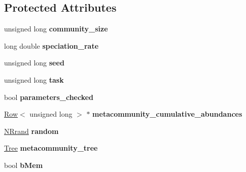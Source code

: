 \subsection*{Protected Attributes}
\begin{DoxyCompactItemize}
\item 
unsigned long {\bfseries community\+\_\+size}\hypertarget{class_metacommunity_a3b392090e764ffb2ada3881e4eddd0b1}{}\label{class_metacommunity_a3b392090e764ffb2ada3881e4eddd0b1}

\item 
long double {\bfseries speciation\+\_\+rate}\hypertarget{class_metacommunity_aad4378b40264345fc6f5116aedc58c26}{}\label{class_metacommunity_aad4378b40264345fc6f5116aedc58c26}

\item 
unsigned long {\bfseries seed}\hypertarget{class_metacommunity_afd81750697ac8540b71de001ee53fc61}{}\label{class_metacommunity_afd81750697ac8540b71de001ee53fc61}

\item 
unsigned long {\bfseries task}\hypertarget{class_metacommunity_a094dfd2d0bb737a1f5bd06ceb3c6da1f}{}\label{class_metacommunity_a094dfd2d0bb737a1f5bd06ceb3c6da1f}

\item 
bool {\bfseries parameters\+\_\+checked}\hypertarget{class_metacommunity_a8b0ca689c1c638e49424d59fadb2e28d}{}\label{class_metacommunity_a8b0ca689c1c638e49424d59fadb2e28d}

\item 
\hyperlink{class_row}{Row}$<$ unsigned long $>$ $\ast$ {\bfseries metacommunity\+\_\+cumulative\+\_\+abundances}\hypertarget{class_metacommunity_ae9ef6b36732d3269baef697b5341c0b9}{}\label{class_metacommunity_ae9ef6b36732d3269baef697b5341c0b9}

\item 
\hyperlink{class_n_rrand}{N\+Rrand} {\bfseries random}\hypertarget{class_metacommunity_aa47b2ff3f6944143f8e734d0988d2ff3}{}\label{class_metacommunity_aa47b2ff3f6944143f8e734d0988d2ff3}

\item 
\hyperlink{class_tree}{Tree} {\bfseries metacommunity\+\_\+tree}\hypertarget{class_metacommunity_a85e91103025feb641bf0df9d02152b99}{}\label{class_metacommunity_a85e91103025feb641bf0df9d02152b99}

\item 
bool {\bfseries b\+Mem}\hypertarget{class_community_ad5344789223153c3756dbad28948410b}{}\label{class_community_ad5344789223153c3756dbad28948410b}


\end{DoxyCompactItemize}
